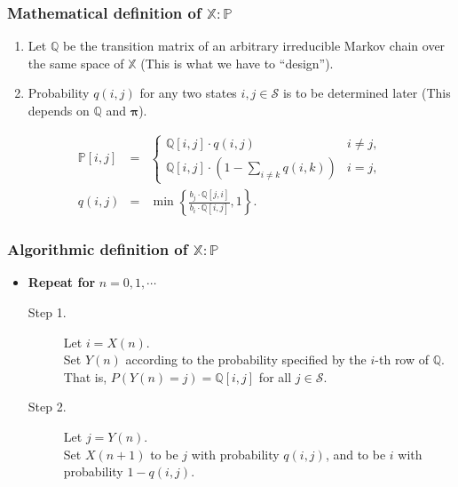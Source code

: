 \subsubsection{Mathematical definition of $ \mathbb{X} : \mathbb{P} $}
\begin{enumerate}
  \item Let $ \mathbb{Q} $ be the transition matrix of an arbitrary irreducible Markov chain over the same space of $ \mathbb{X} $ (This is what we have to ``design'').
  \item Probability $ q(i, j) $ for any two states $ i, j \in \mathcal{S} $ is to be determined later (This depends on $ \mathbb{Q} $ and $ \boldsymbol\pi $).
\end{enumerate}
\begin{eqnarray*}
\mathbb{P}[i, j] & = &
  \begin{cases}
    \mathbb{Q}[i, j] \cdot q(i, j)                        & i \neq j, \\
    \mathbb{Q}[i, j] \cdot (1 - \sum_{i \neq k} q(i, k))  & i = j,
  \end{cases} \\
q(i, j) & = & \min \left\{ \frac{b_{j} \cdot \mathbb{Q}[j, i]}{b_{i} \cdot \mathbb{Q}[i, j]}, 1 \right\}.
\end{eqnarray*}

\subsubsection{Algorithmic definition of $ \mathbb{X} : \mathbb{P} $}
\begin{itemize}
  \item \textbf{Repeat for} $ n = 0, 1, \cdots $
    \begin{description}
      \item[Step 1.] Let $ i = X(n) $. \\
        Set $ Y(n) $ according to the probability specified by the $ i $-th row of $ \mathbb{Q} $. \\
        That is, $ P(Y(n) = j) = \mathbb{Q}[i, j] $ for all $ j \in \mathcal{S} $.
      \item[Step 2.] Let $ j = Y(n) $. \\
        Set $ X(n + 1) $ to be $ j $ with probability $ q(i, j) $, and to be $ i $ with probability $ 1 - q(i, j) $.
    \end{description}
\end{itemize}

